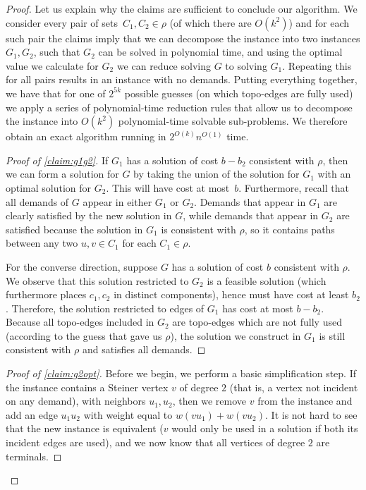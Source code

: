 \documentclass[a4paper]{article}
\theoremstyle{plain}
\begin{document}
\begin{proof}
Let us explain why the claims are sufficient to conclude our algorithm. We
consider every pair of sets~$C_1,C_2\in\rho$ (of which there are $O(k^2)$) and
for each such pair the claims imply that we can decompose the instance into two
instances $G_1,G_2$, such that $G_2$ can be solved in polynomial time, and
using the optimal value we calculate for $G_2$ we can reduce solving $G$ to
solving $G_1$. Repeating this for all  pairs results in an instance with no
demands. Putting everything together, we have that for one of $2^{5k}$ possible
guesses (on which topo-edges are fully used) we apply a series of
polynomial-time reduction rules that allow us to decompose the instance into
$O(k^2)$ polynomial-time solvable sub-problems. We therefore obtain an exact
algorithm running in $2^{O(k)}n^{O(1)}$ time. \qedhere


%
\begin{proof}[Proof of \cref{claim:g1g2}]

If $G_1$ has a solution of cost $b-b_2$ consistent with $\rho$, then we can form
a solution for $G$ by taking the union of the solution for $G_1$ with an
optimal solution for $G_2$.  This will have cost at most~$b$. Furthermore,
recall that all demands of $G$ appear in either $G_1$ or $G_2$. Demands that
appear in $G_1$ are clearly satisfied by the new solution in $G$, while demands
that appear in $G_2$ are satisfied because the solution in $G_1$ is consistent
with $\rho$, so it contains paths between any two $u,v\in C_1$ for each $C_1\in
\rho$.

For the converse direction, suppose $G$ has a solution of cost $b$ consistent
with $\rho$. We observe that this solution restricted to $G_2$ is a feasible
solution (which furthermore places $c_1,c_2$ in distinct components), hence
must have cost at least $b_2$. Therefore, the solution restricted to edges of
$G_1$ has cost at most $b-b_2$. Because all topo-edges included in $G_2$ are
topo-edges which are not fully used (according to the guess that gave us
$\rho$), the solution we construct in $G_1$ is still consistent with $\rho$ and
satisfies all demands.  \end{proof}
%

%
\begin{proof}[Proof of \cref{claim:g2opt}]

Before we begin, we perform a basic simplification step. If the instance
contains a Steiner vertex $v$ of degree $2$ (that is, a vertex not incident on
any demand), with neighbors $u_1,u_2$, then we remove $v$ from the instance and
add an edge $u_1u_2$ with weight equal to $w(vu_1)+w(vu_2)$. It is not hard to
see that the new instance is equivalent ($v$ would only be used in a solution
if both its incident edges are used), and we now know that all vertices of
degree $2$ are terminals.


\end{proof}
\end{proof}
\end{document}
